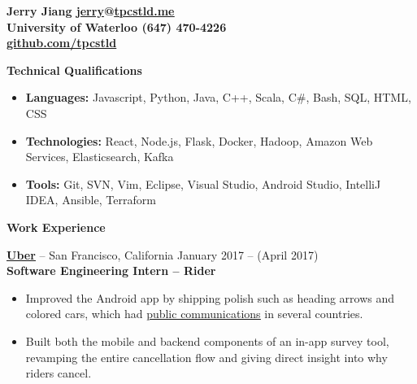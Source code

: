 \documentclass{letter}
\begin{document}
  \thispagestyle{empty}


{\bfseries
  {\Large Jerry Jiang} \hfill \href{mailto:jerry@tpcstld.me}{\uline{jerry}}@\href{http://tpcstld.me}{\uline{tpcstld.me}} \\
  University of Waterloo \hfill (647) 470-4226 \\
\null \hfill \href{https://github.com/tpcstld}{\uline{github.com/tpcstld}}}

{\bfseries \Large Technical Qualifications}

\vspace{-10mm}
\null\hrulefill

\vspace{-3mm}
\begin{itemize}
    \item {\bfseries Languages:}
        Javascript, Python, Java, C++, Scala, C\#, Bash, SQL, HTML, CSS
    \item {\bfseries Technologies:}
        React, Node.js, Flask, Docker, Hadoop, Amazon Web Services,
        Elasticsearch, Kafka
    \item {\bfseries Tools:}
        Git, SVN, Vim, Eclipse, Visual Studio, Android Studio, IntelliJ IDEA,
        Ansible, Terraform
\end{itemize}

{\bfseries \Large Work Experience}

\vspace{-10mm}
\null\hrulefill

\vspace{-1.5mm}
{\bfseries \href{http://uber.com}{\uline{Uber}}} -- San Francisco,
California \hfill January 2017 -- (April 2017)\\
{\bfseries Software Engineering Intern -- Rider}
\vspace{-3mm}
\begin{itemize}
    \item Improved the Android app by shipping polish such as heading arrows and
      colored cars, which had \href{https://newsroom.uber.com/russia/car-color/}
      {\uline{public communications}} in several countries.
    \item Built both the mobile and backend components of an in-app survey tool,
      revamping the entire cancellation flow and giving direct insight into
      why riders cancel.
\end{itemize}
\end{document}
